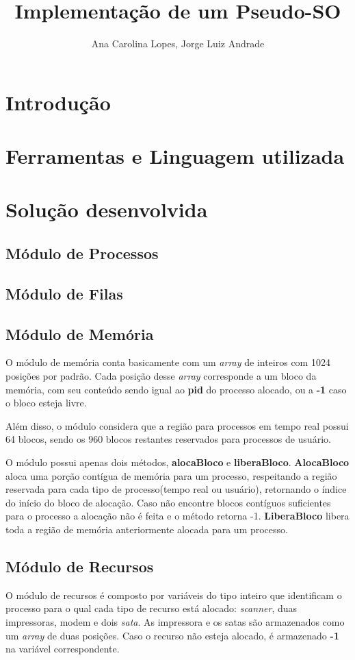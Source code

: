\documentclass[a4paper]{article}
\title{Implementação de um Pseudo-SO}
\author{Ana Carolina Lopes, Jorge Luiz Andrade}
\date{}
\begin{document}
\maketitle

\section{Introdução}

\section{Ferramentas e Linguagem utilizada}

\section{Solução desenvolvida}
\subsection{Módulo de Processos}

\subsection{Módulo de Filas}

\subsection{Módulo de Memória}
	O módulo de memória conta basicamente com um \emph{array} de inteiros com 1024 posições por padrão. Cada posição desse \emph{array} corresponde a um bloco da memória, com seu conteúdo sendo igual ao \textbf{pid} do processo alocado, ou a \textbf{-1} caso o bloco esteja livre.
	
	Além disso, o módulo considera que a região para processos em tempo real possui 64 blocos, sendo os 960 blocos restantes reservados para processos de usuário.
	
	O módulo possui apenas dois métodos, \textbf{alocaBloco} e \textbf{liberaBloco}. \textbf{AlocaBloco} aloca uma porção contígua de memória para um processo, respeitando a região reservada para cada tipo de processo(tempo real ou usuário), retornando o índice do início do bloco de alocação. Caso não encontre blocos contíguos suficientes para o processo a alocação não é feita e o método retorna -1. \textbf{LiberaBloco} libera toda a região de memória anteriormente alocada para um processo.

\subsection{Módulo de Recursos}
	O módulo de recursos é composto por variáveis do tipo inteiro que identificam o processo para o qual cada tipo de recurso está alocado: \emph{scanner}, duas impressoras, modem e dois \emph{sata}. As impressora e os satas são armazenados como um \emph{array} de duas posições. Caso o recurso não esteja alocado, é armazenado \textbf{-1} na variável correspondente.
\end{document}

